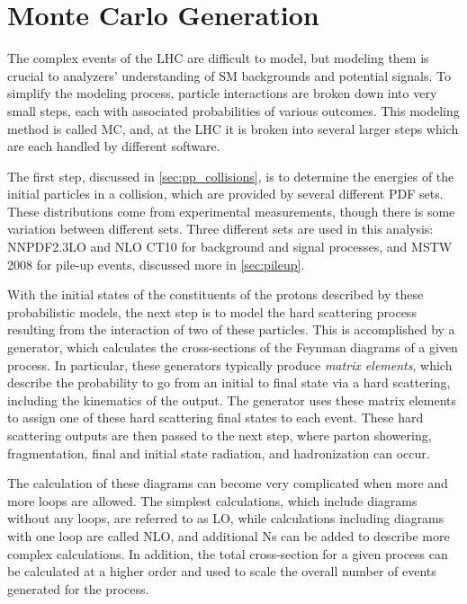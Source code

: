 \section{Monte Carlo Generation}
\label{sec:MC_gen}

The complex events of the \ac{LHC} are difficult to model, but modeling them is crucial to analyzers' understanding of \ac{SM} backgrounds and potential signals. To simplify the modeling process, particle interactions are broken down into very small steps, each with associated probabilities of various outcomes. This modeling method is called \acf{MC}, and, at the \ac{LHC} it is broken into several larger steps which are each handled by different software. 

The first step, discussed in \autoref{sec:pp_collisions}, is to determine the energies of the initial particles in a collision, which are provided by several different \ac{PDF} sets. These distributions come from experimental measurements, though there is some variation between different sets. Three different sets are used in this analysis: NNPDF2.3LO \cite{Ball:2012cx} and NLO CT10 \cite{Lai:2010vv} for background and signal processes, and MSTW 2008 \cite{0901.0002} for pile-up events, discussed more in \autoref{sec:pileup}. 

With the initial states of the constituents of the protons described by these probabilistic models, the next step is to model the hard scattering process resulting from the interaction of two of these particles. This is accomplished by a generator, which calculates the cross-sections of the Feynman diagrams of a given process. In particular, these generators typically produce \textit{matrix elements}, which describe the probability to go from an initial to final state via a hard scattering, including the kinematics of the output. The generator uses these matrix elements to assign one of these hard scattering final states to each event. These hard scattering outputs are then passed to the next step, where parton showering, fragmentation, final and initial state radiation, and hadronization can occur.

The calculation of these diagrams can become very complicated when more and more loops are allowed. The simplest calculations, which include diagrams without any loops, are referred to as \ac{LO}, while calculations including diagrams with one loop are called \ac{NLO}, and additional Ns can be added to describe more complex calculations. In addition, the total cross-section for a given process can be calculated at a higher order and used to scale the overall number of events generated for the process. 

